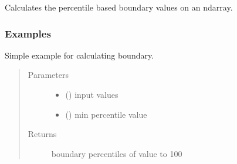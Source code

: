 \documentclass[letterpaper,10pt,english]{sphinxmanual}
\begin{document}
\begin{fulllineitems}

\begin{fulllineitems}
\label{\detokenize{docs/source/preprocess:preprocess.preprocess_tools.Scaler.calc_boundary}}
Calculates the percentile based boundary values on an ndarray.
\subsubsection*{Examples}

Simple example for calculating boundary.

\begin{sphinxVerbatim}[commandchars=\\\{\}]
  \PYG{p}{[}\PYG{p}{[}    \PYG{p}{]}\PYG{p}{[}    \PYG{p}{]}\PYG{p}{]}
  
 
\end{sphinxVerbatim}
\begin{quote}\begin{description}
\item[{Parameters}] \leavevmode\begin{itemize}
\item {} 
 () \textendash{} input values

\item {} 
 () \textendash{} min percentile value

\end{itemize}

\item[{Returns}] \leavevmode
boundary percentiles of value  to 100


\end{description}
\end{quote}
\end{fulllineitems}
\end{fulllineitems}
\end{document}
